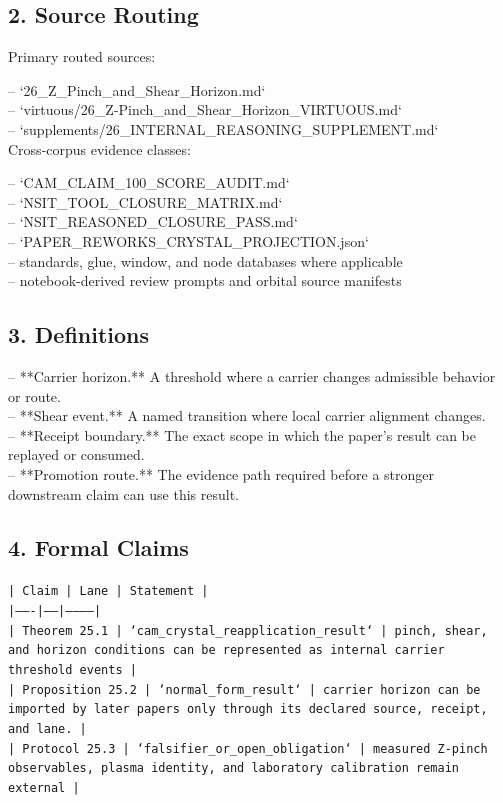 \documentclass[11pt]{article}
\begin{document}
\subsection*{2. Source Routing}

Primary routed sources:

\noindent{}-- `26\_Z\_Pinch\_and\_Shear\_Horizon.md`\\
\noindent{}-- `virtuous/26\_Z-Pinch\_and\_Shear\_Horizon\_VIRTUOUS.md`\\
\noindent{}-- `supplements/26\_INTERNAL\_REASONING\_SUPPLEMENT.md`\\

Cross-corpus evidence classes:

\noindent{}-- `CAM\_CLAIM\_100\_SCORE\_AUDIT.md`\\
\noindent{}-- `NSIT\_TOOL\_CLOSURE\_MATRIX.md`\\
\noindent{}-- `NSIT\_REASONED\_CLOSURE\_PASS.md`\\
\noindent{}-- `PAPER\_REWORKS\_CRYSTAL\_PROJECTION.json`\\
\noindent{}-- standards, glue, window, and node databases where applicable\\
\noindent{}-- notebook-derived review prompts and orbital source manifests\\

\subsection*{3. Definitions}

\noindent{}-- **Carrier horizon.** A threshold where a carrier changes admissible behavior or route.\\
\noindent{}-- **Shear event.** A named transition where local carrier alignment changes.\\
\noindent{}-- **Receipt boundary.** The exact scope in which the paper's result can be replayed or consumed.\\
\noindent{}-- **Promotion route.** The evidence path required before a stronger downstream claim can use this result.\\

\subsection*{4. Formal Claims}

\noindent\texttt{| Claim | Lane | Statement |}\\
\noindent\texttt{|-------|------|-----------|}\\
\noindent\texttt{| Theorem 25.1 | `cam\_crystal\_reapplication\_result` | pinch, shear, and horizon conditions can be represented as internal carrier threshold events |}\\
\noindent\texttt{| Proposition 25.2 | `normal\_form\_result` | carrier horizon can be imported by later papers only through its declared source, receipt, and lane. |}\\
\noindent\texttt{| Protocol 25.3 | `falsifier\_or\_open\_obligation` | measured Z-pinch observables, plasma identity, and laboratory calibration remain external |}\\
\end{document}
